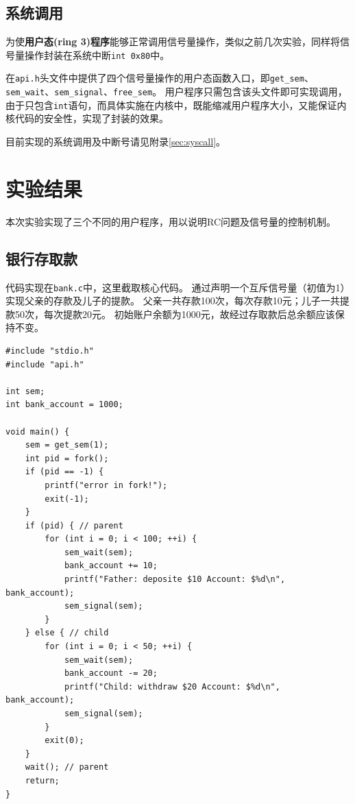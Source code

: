 \documentclass[logo,reportComp]{thesis}
\begin{document}
\subsection{系统调用}
为使\textbf{用户态(ring 3)程序}能够正常调用信号量操作，类似之前几次实验，同样将信号量操作封装在系统中断\verb'int 0x80'中。

在\verb'api.h'头文件中提供了四个信号量操作的用户态函数入口，即\verb'get_sem'、\verb'sem_wait'、\verb'sem_signal'、\verb'free_sem'。
用户程序只需包含该头文件即可实现调用，由于只包含\verb'int'语句，而具体实施在内核中，既能缩减用户程序大小，又能保证内核代码的安全性，实现了封装的效果。

目前实现的系统调用及中断号请见附录\ref{sec:syscall}。

\section{实验结果}
本次实验实现了三个不同的用户程序，用以说明RC问题及信号量的控制机制。

\subsection{银行存取款}
代码实现在\verb'bank.c'中，这里截取核心代码。
通过声明一个互斥信号量（初值为1）实现父亲的存款及儿子的提款。
父亲一共存款100次，每次存款10元；儿子一共提款50次，每次提款20元。
初始账户余额为1000元，故经过存取款后总余额应该保持不变。
\begin{lstlisting}
#include "stdio.h"
#include "api.h"

int sem;
int bank_account = 1000;

void main() {
	sem = get_sem(1);
	int pid = fork();
	if (pid == -1) {
		printf("error in fork!");
		exit(-1);
	}
	if (pid) { // parent
		for (int i = 0; i < 100; ++i) {
			sem_wait(sem);
			bank_account += 10;
			printf("Father: deposite $10 Account: $%d\n", bank_account);
			sem_signal(sem);
		}
	} else { // child
		for (int i = 0; i < 50; ++i) {
			sem_wait(sem);
			bank_account -= 20;
			printf("Child: withdraw $20 Account: $%d\n", bank_account);
			sem_signal(sem);
		}
		exit(0);
	}
	wait(); // parent
	return;
}
\end{lstlisting}
\end{document}
